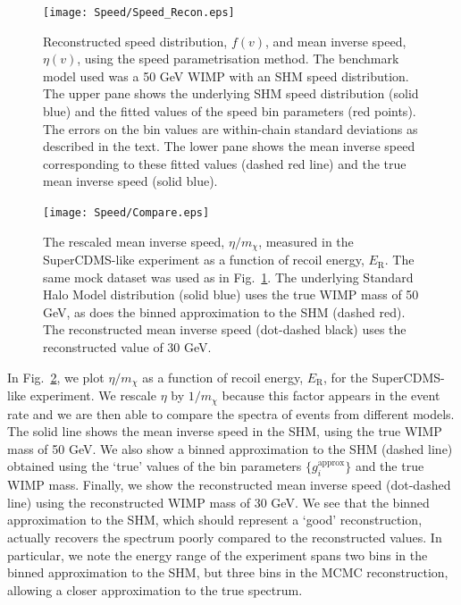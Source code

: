  \begin{figure}[t]
\centering
  \texttt{[image: Speed/Speed\_Recon.eps]}
\caption[Reconstructed speed distribution and mean inverse speed using the binned speed parametrisation]{Reconstructed speed distribution, $f(v)$, and mean inverse speed, $\eta(v)$, using the speed parametrisation method. The benchmark model used was a 50 GeV WIMP with an SHM speed distribution. The upper pane shows the underlying SHM speed distribution (solid blue) and the fitted values of the speed bin parameters (red points). The errors on the bin values are within-chain standard deviations as described in the text. The lower pane shows the mean inverse speed corresponding to these fitted values (dashed red line) and the true mean inverse speed (solid blue).}
  \label{fig:Speed:Speed_Recon}
\end{figure}

 \begin{figure}[t]
\centering
  \texttt{[image: Speed/Compare.eps]}
\caption[Reconstructed mean inverse speed for the SuperCDMS-like experiment]{The rescaled mean inverse speed, \(\eta/m_\chi\), measured in the SuperCDMS-like experiment as a function of recoil energy, \(E_\textrm{R}\). The same mock dataset was used as in Fig.\ \ref{fig:Speed:Speed_Recon}. The underlying Standard Halo Model distribution (solid blue) uses the true WIMP mass of 50 GeV, as does the binned approximation to the SHM (dashed red). The reconstructed mean inverse speed (dot-dashed black) uses the reconstructed value of 30 GeV.}
  \label{fig:Speed:Compare}
\end{figure}


In Fig.\ \ref{fig:Speed:Compare}, we plot \(\eta/m_\chi\) as a function of recoil energy, \(E_\textrm{R}\), for the SuperCDMS-like experiment. We rescale \(\eta\) by \(1/m_\chi\) because this factor appears in the event rate and we are then able to compare the spectra of events from different models. The solid line shows the mean inverse speed in the SHM, using the true WIMP mass of 50 GeV. We also show a binned approximation to the SHM (dashed line) obtained using the `true' values of the bin parameters \(\{g_i^\textrm{approx}\}\) and the true WIMP mass. Finally, we show the reconstructed mean inverse speed (dot-dashed line) using the reconstructed WIMP mass of 30 GeV. We see that the binned approximation to the SHM, which should represent a `good' reconstruction, actually recovers the spectrum poorly compared to the reconstructed values. In particular, we note the energy range of the experiment spans two bins in the binned approximation to the SHM, but three bins in the MCMC reconstruction, allowing a closer approximation to the true spectrum.

